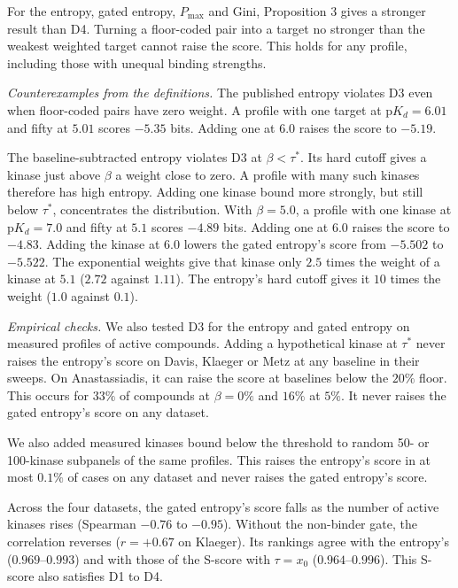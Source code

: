 For the entropy, gated entropy, $P_{\max}$ and Gini, Proposition 3 gives a
stronger result than D4. Turning a floor-coded pair into a target no stronger
than the weakest weighted target cannot raise the score. This holds for any
profile, including those with unequal binding strengths.

\emph{Counterexamples from the definitions.} The published entropy violates
D3 even when floor-coded pairs have zero weight. A profile with one target
at $\mathrm{p}K_d = 6.01$ and fifty at $5.01$ scores $-5.35$ bits. Adding one
at $6.0$ raises the score to $-5.19$.

The baseline-subtracted entropy violates D3 at $\beta < \tau^*$.
Its hard cutoff gives a kinase just above $\beta$ a weight close to zero. A
profile with many such kinases therefore has high entropy. Adding one kinase
bound more strongly, but still below $\tau^*$, concentrates the distribution.
With $\beta = 5.0$, a profile with one kinase at $\mathrm{p}K_d = 7.0$ and
fifty at $5.1$ scores $-4.89$ bits. Adding one at $6.0$ raises the score to
$-4.83$.
Adding the kinase at $6.0$ lowers the gated entropy's score from $-5.502$
to $-5.522$. The exponential weights
give that kinase only $2.5$ times the weight of a kinase at $5.1$ ($2.72$
against $1.11$). The entropy's hard cutoff gives it $10$ times the weight
($1.0$ against $0.1$).

\emph{Empirical checks.} We also tested D3 for the entropy and gated entropy
on measured profiles of active compounds. Adding a hypothetical kinase at
$\tau^*$ never raises the entropy's score on Davis, Klaeger or Metz at any
baseline in their sweeps. On Anastassiadis, it can raise the score at
baselines below the $20\%$ floor. This occurs for $33\%$ of compounds at
$\beta = 0\%$ and $16\%$ at $5\%$. It never raises the gated entropy's score
on any dataset.

We also added measured kinases bound below the threshold to random 50- or
100-kinase subpanels of the same profiles. This raises the entropy's score
in at most $0.1\%$ of cases on any dataset and never raises the gated
entropy's score.

Across the four datasets, the gated entropy's score falls as the number of
active kinases rises (Spearman $-0.76$ to $-0.95$). Without the non-binder
gate, the correlation reverses ($r = +0.67$ on Klaeger). Its rankings agree
with the entropy's ($0.969$--$0.993$) and with those of the S-score with
$\tau = x_0$ ($0.964$--$0.996$). This S-score also satisfies D1 to D4.

